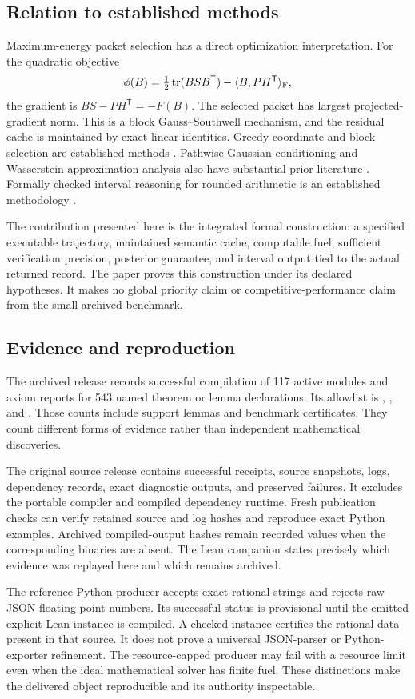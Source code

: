 \subsection{Relation to established methods}
Maximum-energy packet selection has a direct optimization interpretation. For the quadratic objective
\[
\phi(B)=\tfrac12\operatorname{tr}(BSB^{\mathsf T})-\langle B,PH^{\mathsf T}\rangle_{\mathrm F},
\]
the gradient is $BS-PH^{\mathsf T}=-F(B)$. The selected packet has largest projected-gradient norm. This is a block Gauss--Southwell mechanism, and the residual cache is maintained by exact linear identities. Greedy coordinate and block selection are established methods \cite{nutini2015,nutini2022}. Pathwise Gaussian conditioning and Wasserstein approximation analysis also have substantial prior literature \cite{wilson2021}. Formally checked interval reasoning for rounded arithmetic is an established methodology \cite{daumas2007}.

The contribution presented here is the integrated formal construction: a specified executable trajectory, maintained semantic cache, computable fuel, sufficient verification precision, posterior guarantee, and interval output tied to the actual returned record. The paper proves this construction under its declared hypotheses. It makes no global priority claim or competitive-performance claim from the small archived benchmark.

\subsection{Evidence and reproduction}
The archived release records successful compilation of 117 active modules and axiom reports for 543 named theorem or lemma declarations. Its allowlist is , , and . Those counts include support lemmas and benchmark certificates. They count different forms of evidence rather than independent mathematical discoveries.

The original source release contains successful receipts, source snapshots, logs, dependency records, exact diagnostic outputs, and preserved failures. It excludes the portable compiler and compiled dependency runtime. Fresh publication checks can verify retained source and log hashes and reproduce exact Python examples. Archived compiled-output hashes remain recorded values when the corresponding binaries are absent. The Lean companion states precisely which evidence was replayed here and which remains archived.

The reference Python producer accepts exact rational strings and rejects raw JSON floating-point numbers. Its successful status is provisional until the emitted explicit Lean instance is compiled. A checked instance certifies the rational data present in that source. It does not prove a universal JSON-parser or Python-exporter refinement. The resource-capped producer may fail with a resource limit even when the ideal mathematical solver has finite fuel. These distinctions make the delivered object reproducible and its authority inspectable.
